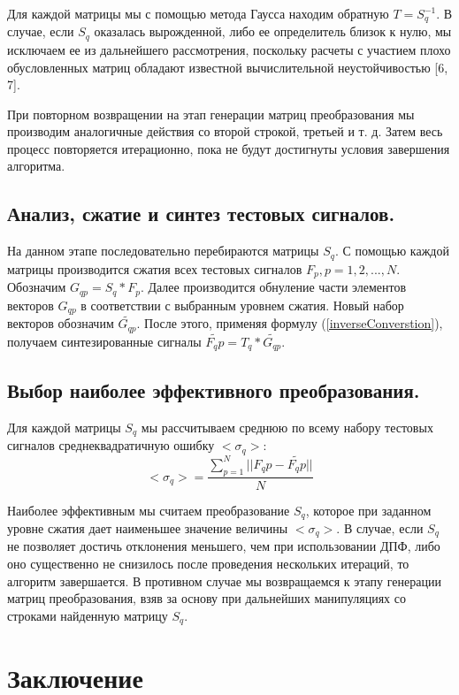 \documentclass[11pt, oneside, a4paper]{article}
\begin{document}
Для каждой матрицы мы с помощью метода Гаусса находим обратную $T=S_q^{-1}$. В случае, если $S_q$ оказалась вырожденной, либо ее определитель близок к нулю, мы исключаем ее из дальнейшего рассмотрения, поскольку расчеты с участием плохо обусловленных матриц обладают известной вычислительной неустойчивостью [6, 7].

При повторном возвращении на этап генерации матриц преобразования мы производим аналогичные действия со второй строкой, третьей и т. д. Затем весь процесс повторяется итерационно, пока не будут достигнуты условия завершения алгоритма. 

\subsection{Анализ, сжатие и синтез тестовых сигналов.}

На данном этапе последовательно перебираются матрицы $S_q$. С помощью каждой матрицы производится сжатия всех тестовых сигналов $F_p, p=1,2,...,N$. Обозначим $G_{qp}=S_q*F_p$. Далее производится обнуление части элементов векторов $G_{qp}$ в соответствии с выбранным уровнем сжатия. Новый набор векторов обозначим $\tilde{G_{qp}}$. После этого, применяя формулу (\ref{inverseConverstion}), получаем синтезированные сигналы $\tilde{F_qp}=T_q*\tilde{G_{qp}}$.

\subsection{Выбор наиболее эффективного преобразования.}

Для каждой матрицы $S_q$ мы рассчитываем среднюю по всему набору тестовых сигналов среднеквадратичную ошибку $<\sigma_q>$:
\begin{equation}
\label{squareNormQ}
    <\sigma_q> = \frac{\sum\limits_{p=1}^{N}||F_qp-\tilde{F_qp}||}{N}
\end{equation}

Наиболее эффективным мы считаем преобразование $S_q$, которое при заданном уровне сжатия дает наименьшее значение величины $<\sigma_q>$. В случае, если $S_q$ не позволяет достичь отклонения  меньшего, чем при использовании ДПФ, либо оно существенно не снизилось после проведения нескольких итераций, то алгоритм завершается. В противном случае мы возвращаемся к этапу генерации матриц преобразования, взяв за основу при дальнейших манипуляциях со строками найденную матрицу $S_q$.

\section{Заключение}
\end{document}
